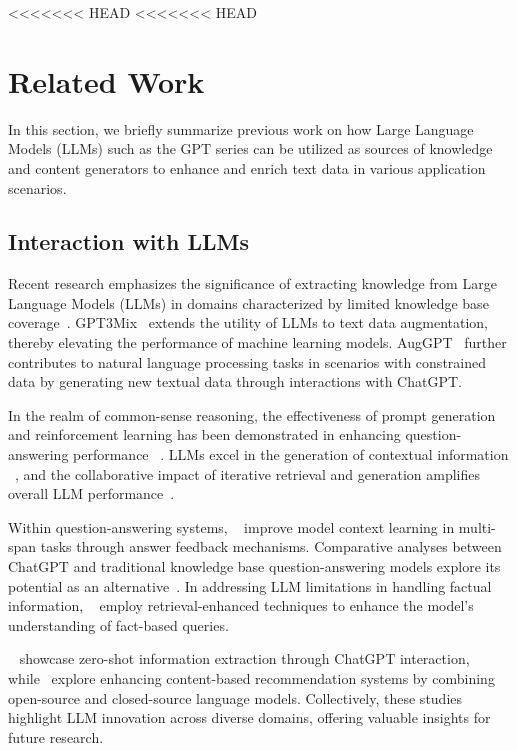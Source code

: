 <<<<<<< HEAD
<<<<<<< HEAD

\section{Related Work}
\label{sec:related}
In this section, we briefly summarize previous work on how Large Language Models (LLMs) such as the GPT series can be utilized as sources of knowledge and content generators to enhance and enrich text data in various application scenarios.
\subsection{Interaction with LLMs}
Recent research emphasizes the significance of extracting knowledge from Large Language Models (LLMs) in domains characterized by limited knowledge base coverage~\citep{fang2021leveraging}.
GPT3Mix~\citep{yoo2021gpt3mix} extends the utility of LLMs to text data augmentation, thereby elevating the performance of machine learning models. 
AugGPT~\citep{dai2023auggpt} further contributes to natural language processing tasks in scenarios with constrained data by generating new textual data through interactions with ChatGPT.

In the realm of common-sense reasoning, the effectiveness of prompt generation and reinforcement learning has been demonstrated in enhancing question-answering performance ~\citep{liu2021generated,liu2022rainier}. 
LLMs excel in the generation of contextual information ~\citep{yu2022generate}, 
and the collaborative impact of iterative retrieval and generation amplifies overall LLM performance~\citep{shao2023enhancing}.

Within question-answering systems, ~\citep{huang2023enhancing} improve model context learning in multi-span tasks through answer feedback mechanisms. 
Comparative analyses between ChatGPT and traditional knowledge base question-answering models explore its potential as an alternative~\citep{tan2023can}. 
In addressing LLM limitations in handling factual information, ~\citep{ren2023investigating} employ retrieval-enhanced techniques to enhance the model's understanding of fact-based queries.

~\citep{wei2023zero} showcase zero-shot information extraction through ChatGPT interaction, 
while~\citep{wei2023zero} explore enhancing content-based recommendation systems by combining open-source and closed-source language models. 
Collectively, these studies highlight LLM innovation across diverse domains, offering valuable insights for future research.

